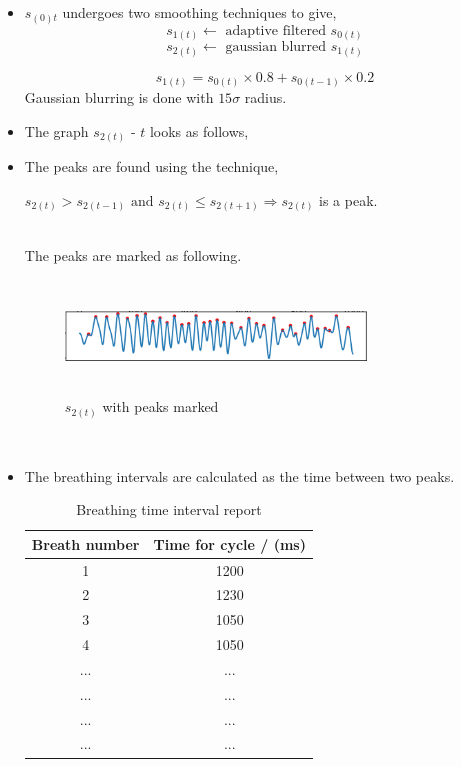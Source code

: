 \documentclass{report}
\begin{document}
\begin{itemize}
    \item $s_{(0)t}$ undergoes two smoothing techniques to give,
    $$s_{1(t)} \leftarrow \textrm{ adaptive filtered } s_{0(t)} $$
    $$s_{2(t)} \leftarrow \textrm{ gaussian blurred } s_{1(t)} $$
    
    $$s_{1(t)}=s_{0(t)}\times 0.8 + s_{0(t-1)}\times0.2 $$
    Gaussian blurring is done with $15\sigma$ radius.\\
    
    \item The graph $s_{2(t)} \textrm{ - } t $ looks as follows,\\
    
    \item The peaks are found using the technique,
    \begin{center} $s_{2(t)}>s_{2(t-1)} \textrm{ and } s_{2(t)} \leq s_{2(t+1)} \Rightarrow s_{2(t)} $ is a peak.\end{center}\\
    The peaks are marked as following.\\
    
    \begin{figure}[H]
        \centering
        \includegraphics[width=8cm, height=3cm]{s1}
        \caption{$s_{2(t)}$ with peaks marked}
        \label{fig:my_label}
    \end{figure}\\
   
    \item The breathing intervals are calculated as the time between two peaks.
    


    

    \begin{table}[H]
    \begin{center}\begin{tabular}{|c|c|}
        \hline
         Breath number& Time for cycle / (ms) \\
         \hline
         1&1200\\2&1230\\3&1050\\4&1050\\
         ...&...\\...&...\\...&...\\...&...\\
         \hline
    \end{tabular}
        \caption{Breathing time interval report}
        \label{tab:my_label}
    \end{center}
    \end{table}    

    
    
    
\end{itemize}
\end{document}
